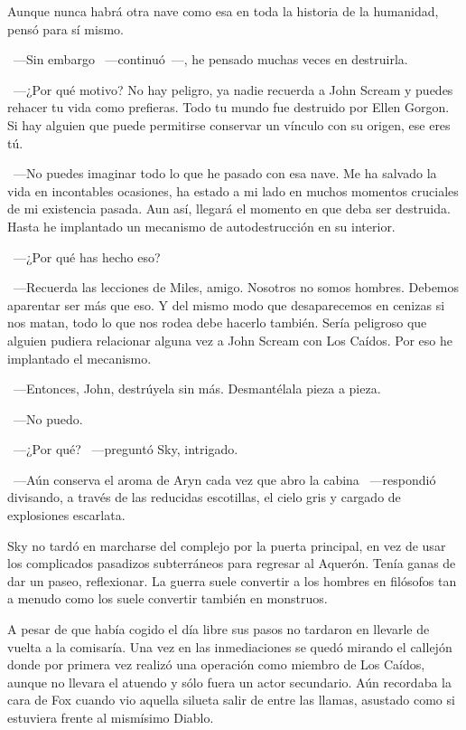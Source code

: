 Aunque nunca habrá otra nave como esa en toda la historia de la humanidad, pensó para sí mismo.

~---Sin embargo ~---continuó~---, he pensado muchas veces en destruirla.

~---¿Por qué motivo? No hay peligro, ya nadie recuerda a John Scream y puedes rehacer tu vida como prefieras. Todo tu mundo fue destruido por Ellen Gorgon. Si hay alguien que puede permitirse conservar un vínculo con su origen, ese eres tú.

~---No puedes imaginar todo lo que he pasado con esa nave. Me ha salvado la vida en incontables ocasiones, ha estado a mi lado en muchos momentos cruciales de mi existencia pasada. Aun así, llegará el momento en que deba ser destruida. Hasta he implantado un mecanismo de autodestrucción en su interior.

~---¿Por qué has hecho eso?

~---Recuerda las lecciones de Miles, amigo. Nosotros no somos hombres. Debemos aparentar ser más que eso. Y del mismo modo que desaparecemos en cenizas si nos matan, todo lo que nos rodea debe hacerlo también. Sería peligroso que alguien pudiera relacionar alguna vez a John Scream con Los Caídos. Por eso he implantado el mecanismo.

~---Entonces, John, destrúyela sin más. Desmantélala pieza a pieza.

~---No puedo.

~---¿Por qué? ~---preguntó Sky, intrigado.

~---Aún conserva el aroma de Aryn cada vez que abro la cabina ~---respondió divisando, a través de las reducidas escotillas, el cielo gris y cargado de explosiones escarlata.

\bigskip\noindent
Sky no tardó en marcharse del complejo por la puerta principal, en vez de usar los complicados pasadizos subterráneos para regresar al Aquerón. Tenía ganas de dar un paseo, reflexionar. La guerra suele convertir a los hombres en filósofos tan a menudo como los suele convertir también en monstruos.

A pesar de que había cogido el día libre sus pasos no tardaron en llevarle de vuelta a la comisaría. Una vez en las inmediaciones se quedó mirando el callejón donde por primera vez realizó una operación como miembro de Los Caídos, aunque no llevara el atuendo y sólo fuera un actor secundario. Aún recordaba la cara de Fox cuando vio aquella silueta salir de entre las llamas, asustado como si estuviera frente al mismísimo Diablo.

